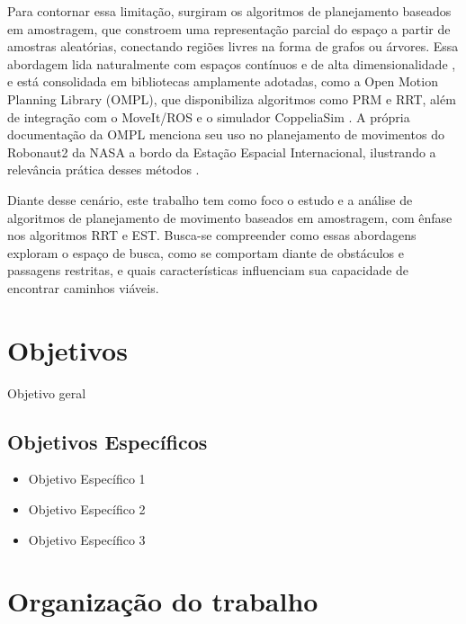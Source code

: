 
Para contornar essa limitação, surgiram os algoritmos de planejamento baseados em amostragem, que constroem uma representação parcial do espaço a partir de amostras aleatórias, conectando regiões livres na forma de grafos ou árvores. Essa abordagem lida naturalmente com espaços contínuos e de alta dimensionalidade \cite{lavalle1998rapidly}, e está consolidada em bibliotecas amplamente adotadas, como a Open Motion Planning Library (OMPL), que disponibiliza algoritmos como PRM e RRT, além de integração com o MoveIt/ROS e o simulador CoppeliaSim \cite{ompl,moveit_ompl}. A própria documentação da OMPL menciona seu uso no planejamento de movimentos do Robonaut2 da NASA a bordo da Estação Espacial Internacional, ilustrando a relevância prática desses métodos \cite{ompl}.

Diante desse cenário, este trabalho tem como foco o estudo e a análise de algoritmos de planejamento de movimento baseados em amostragem, com ênfase nos algoritmos RRT e EST. Busca-se compreender como essas abordagens exploram o espaço de busca, como se comportam diante de obstáculos e passagens restritas, e quais características influenciam sua capacidade de encontrar caminhos viáveis.


\section{Objetivos}

Objetivo geral

\subsection{Objetivos Específicos}
\begin{itemize}
\item Objetivo Específico 1

\item Objetivo Específico 2

\item Objetivo Específico 3

\end{itemize}

\section{Organização do trabalho}

\lipsum[1]